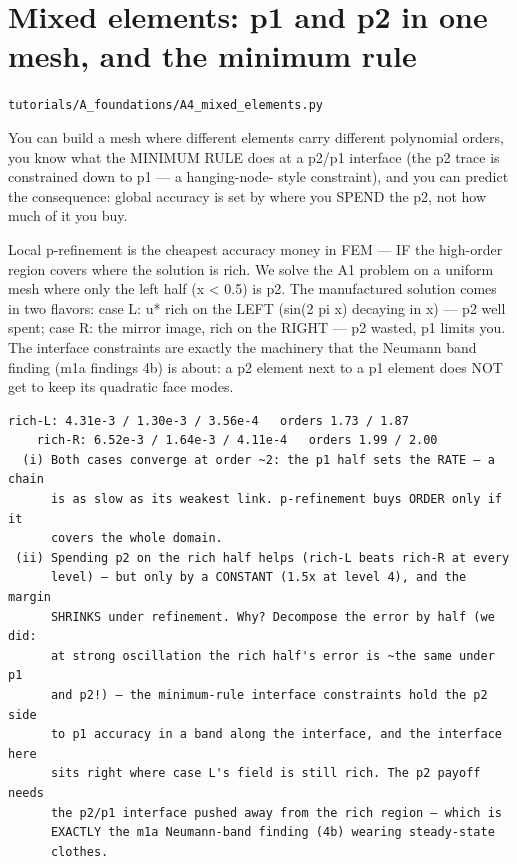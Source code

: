 \chapter{Mixed elements: p1 and p2 in one mesh, and the minimum rule}
\label{ch:A4_mixed_elements}
\noindent\texttt{tutorials/A\_foundations/A4\_mixed\_elements.py}\\[0.75em]
\begin{outcome}
You can build a mesh where different elements carry
different polynomial orders, you know what the MINIMUM RULE does at a
p2/p1 interface (the p2 trace is constrained down to p1 — a hanging-node-
style constraint), and you can predict the consequence: global accuracy is
set by where you SPEND the p2, not how much of it you buy.
\end{outcome}

Local p-refinement is the cheapest accuracy money in FEM — IF
the high-order region covers where the solution is rich. We solve the A1
problem on a uniform mesh where only the left half (x < 0.5) is p2. The
manufactured solution comes in two flavors:
  case L: u* rich on the LEFT  (sin(2 pi x) decaying in x) — p2 well spent;
  case R: the mirror image, rich on the RIGHT — p2 wasted, p1 limits you.
The interface constraints are exactly the machinery that the Neumann band
finding (m1a findings 4b) is about: a p2 element next to a p1 element does
NOT get to keep its quadratic face modes.

\begin{expected}
\begin{verbatim}
rich-L: 4.31e-3 / 1.30e-3 / 3.56e-4   orders 1.73 / 1.87
    rich-R: 6.52e-3 / 1.64e-3 / 4.11e-4   orders 1.99 / 2.00
  (i) Both cases converge at order ~2: the p1 half sets the RATE — a chain
      is as slow as its weakest link. p-refinement buys ORDER only if it
      covers the whole domain.
 (ii) Spending p2 on the rich half helps (rich-L beats rich-R at every
      level) — but only by a CONSTANT (1.5x at level 4), and the margin
      SHRINKS under refinement. Why? Decompose the error by half (we did:
      at strong oscillation the rich half's error is ~the same under p1
      and p2!) — the minimum-rule interface constraints hold the p2 side
      to p1 accuracy in a band along the interface, and the interface here
      sits right where case L's field is still rich. The p2 payoff needs
      the p2/p1 interface pushed away from the rich region — which is
      EXACTLY the m1a Neumann-band finding (4b) wearing steady-state
      clothes.
\end{verbatim}
\end{expected}

